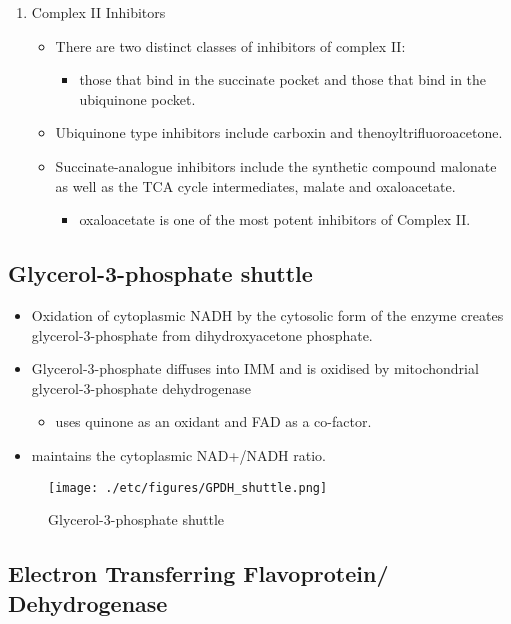 \documentclass{scrartcl}
\begin{document}
\begin{enumerate}
\item Complex II Inhibitors
\label{sec:org407b72f}
\begin{itemize}
\item There are two distinct classes of inhibitors of complex II:
\begin{itemize}
\item those that bind in the succinate pocket and those that bind in the ubiquinone pocket.
\end{itemize}
\item Ubiquinone type inhibitors include carboxin and thenoyltrifluoroacetone.
\item Succinate-analogue inhibitors include the synthetic compound malonate as well as the TCA cycle intermediates, malate and oxaloacetate.
\begin{itemize}
\item oxaloacetate is one of the most potent inhibitors of Complex II.
\end{itemize}
\end{itemize}
\end{enumerate}
\subsection{Glycerol-3-phosphate shuttle}
\label{sec:orgf7fdb2c}
\begin{itemize}
\item Oxidation of cytoplasmic NADH by the cytosolic form of the enzyme
creates glycerol-3-phosphate from dihydroxyacetone phosphate.
\item Glycerol-3-phosphate diffuses into IMM and is oxidised by mitochondrial glycerol-3-phosphate dehydrogenase
\begin{itemize}
\item uses quinone as an oxidant and FAD as a co-factor.
\end{itemize}
\item maintains the cytoplasmic NAD+/NADH ratio.
\end{itemize}

\begin{figure}[htbp]
\centering
\texttt{[image: ./etc/figures/GPDH\_shuttle.png]}
\caption[g3ps]{\label{fig:org33c64cf}
Glycerol-3-phosphate shuttle}
\end{figure}

\subsection{Electron Transferring Flavoprotein/ Dehydrogenase}
\label{sec:org6c3319b}
\end{document}
